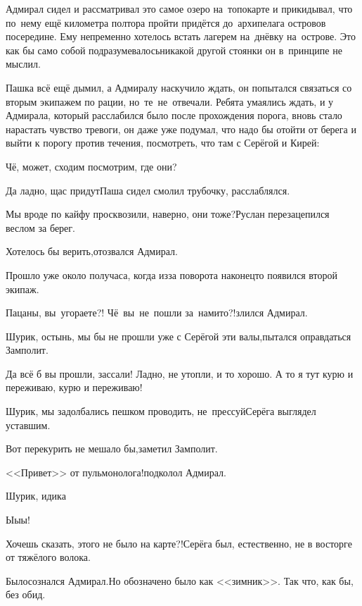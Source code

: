 Адмирал сидел и рассматривал это самое озеро на~топокарте и прикидывал, что по~нему ещё километра полтора пройти придётся до~архипелага островов посередине. Ему непременно хотелось встать лагерем на~днёвку на~острове. Это как бы само собой подразумевалось\mdash никакой другой стоянки он в~принципе не мыслил.

Пашка всё ещё дымил, а Адмиралу наскучило ждать, он попытался связаться со вторым экипажем по рации, но~те~не~отвечали. Ребята умаялись ждать, и у Адмирала, который расслабился было после прохождения порога, вновь стало нарастать чувство тревоги, он даже уже подумал, что надо бы отойти от берега и выйти к порогу против течения, посмотреть, что там с Серёгой и Кирей:

\diagdash Чё, может, сходим посмотрим, где они?

\diagdash Да ладно, щас придут\myldots{}\mdash Паша сидел смолил трубочку, расслаблялся.

\diagdash Мы вроде по кайфу просквозили, наверно, они тоже?\mdash Руслан перезацепился веслом за берег.

\diagdash Хотелось бы верить,\mdash отозвался Адмирал.

Прошло уже около получаса, когда из\sdash за поворота наконец\sdash то появился второй экипаж.

\diagdash Пацаны, вы~угораете?! Чё~вы~не~пошли за~нами\sdash то?!\mdash злился Адмирал.

\diagdash Шурик, остынь, мы бы не прошли уже с Серёгой эти валы,\mdash пытался оправдаться Замполит.

\diagdash Да всё б вы прошли, зассали! Ладно, не утопли, и то хорошо. А то я тут курю и переживаю, курю и переживаю!

\diagdash Шурик, мы задолбались пешком проводить, не~прессуй\myldots{}\mdash Серёга выглядел уставшим.

{
\diagdash Вот перекурить не мешало бы,\mdash заметил Замполит.

\diagdash <<Привет>> от пульмонолога!\mdash подколол Адмирал.
}

\diagdash Шурик, иди\sdash ка\quldots

\diagdash Ы\sdash ы\sdash ы!

\diagdash Хочешь сказать, этого не было на карте?!\mdash Серёга был, естественно, не в восторге от тяжёлого волока.

\diagdash Было\myldots{}\mdash сознался Адмирал.\mdash Но обозначено было как <<зимник>>. Так что, как бы, без обид.

